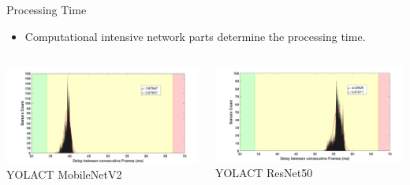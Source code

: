 \documentclass[18pt]{beamer}
\begin{document}
\begin{frame}{Processing Time}
\begin{itemize}
    \item Computational intensive network parts determine the processing time.
\end{itemize}
\begin{columns}
    \begin{column}{0.5\textwidth}
        \centering
        \includegraphics[width=\textwidth]{figures/graphs/dist_yolact_mobilenetv2.png}
        \vfill
        YOLACT MobileNetV2
        \vfill
    \end{column}
    \begin{column}{0.5\textwidth}
        \centering
        \includegraphics[width=\textwidth]{figures/graphs/dist_yolact_resnet50.png}
        \vfill
        YOLACT ResNet50
        \vfill
    \end{column}
\end{columns}
\end{frame}
\end{document}
